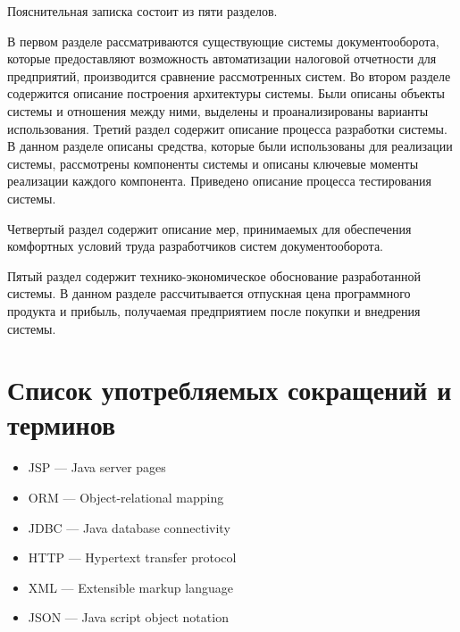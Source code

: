 \documentclass[14pt,a4paper]{reportmod}
\begin{document}
Пояснительная записка состоит из пяти разделов.


В первом разделе рассматриваются существующие системы документооборота, которые предоставляют возможность автоматизации налоговой отчетности для предприятий, производится сравнение рассмотренных систем. Во втором разделе содержится описание построения архитектуры системы. Были описаны объекты системы и отношения между ними, выделены и проанализированы варианты использования. Третий раздел содержит описание процесса разработки системы. В данном разделе описаны средства, которые были использованы для реализации системы, рассмотрены компоненты системы и описаны ключевые моменты реализации каждого компонента. Приведено описание процесса тестирования системы.

Четвертый раздел содержит описание мер, принимаемых для обеспечения комфортных условий труда разработчиков систем документооборота.

Пятый раздел содержит технико-экономическое обоснование разработанной системы. В данном разделе рассчитывается отпускная цена программного продукта и прибыль, получаемая предприятием после покупки и внедрения системы.

\newpage %

\tableofcontents
\thispagestyle{empty}

\chapter*{Список употребляемых сокращений и терминов}
\renewcommand{\labelitemi}{}
\begin{itemize}
   --- Система электронного документооборота
   --- Система управления базой данных
   --- Абстрактное синтаксическое дерево
  \item JSP --- Java server pages
  \item ORM --- Object-relational mapping
  \item JDBC --- Java database connectivity
  \item HTTP --- Hypertext transfer protocol
  \item XML --- Extensible markup language
  \item JSON --- Java script object notation
\end{itemize}
\renewcommand{\labelitemi}{---}
\end{document}

